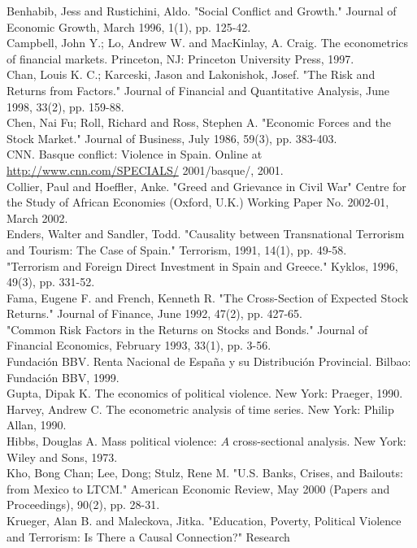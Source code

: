 \documentclass[10pt]{article}
\begin{document}
Benhabib, Jess and Rustichini, Aldo. "Social Conflict and Growth." Journal of Economic Growth, March 1996, 1(1), pp. 125-42.\\
Campbell, John Y.; Lo, Andrew W. and MacKinlay, A. Craig. The econometrics of financial markets. Princeton, NJ: Princeton University Press, 1997.\\
Chan, Louis K. C.; Karceski, Jason and Lakonishok, Josef. "The Risk and Returns from Factors." Journal of Financial and Quantitative Analysis, June 1998, 33(2), pp. 159-88.\\
Chen, Nai Fu; Roll, Richard and Ross, Stephen A. "Economic Forces and the Stock Market." Journal of Business, July 1986, 59(3), pp. 383-403.\\
CNN. Basque conflict: Violence in Spain. Online at \href{http://www.cnn.com/SPECIALS/}{http://www.cnn.com/SPECIALS/} 2001/basque/, 2001.\\
Collier, Paul and Hoeffler, Anke. "Greed and Grievance in Civil War" Centre for the Study of African Economies (Oxford, U.K.) Working Paper No. 2002-01, March 2002.\\
Enders, Walter and Sandler, Todd. "Causality between Transnational Terrorism and Tourism: The Case of Spain." Terrorism, 1991, 14(1), pp. 49-58.\\
"Terrorism and Foreign Direct Investment in Spain and Greece." Kyklos, 1996, 49(3), pp. 331-52.\\
Fama, Eugene F. and French, Kenneth R. "The Cross-Section of Expected Stock Returns." Journal of Finance, June 1992, 47(2), pp. 427-65.\\
"Common Risk Factors in the Returns on Stocks and Bonds." Journal of Financial Economics, February 1993, 33(1), pp. 3-56.\\
Fundación BBV. Renta Nacional de España y su Distribución Provincial. Bilbao: Fundación BBV, 1999.\\
Gupta, Dipak K. The economics of political violence. New York: Praeger, 1990.\\
Harvey, Andrew C. The econometric analysis of time series. New York: Philip Allan, 1990.\\
Hibbs, Douglas A. Mass political violence: $A$ cross-sectional analysis. New York: Wiley and Sons, 1973.\\
Kho, Bong Chan; Lee, Dong; Stulz, Rene M. "U.S. Banks, Crises, and Bailouts: from Mexico to LTCM." American Economic Review, May 2000 (Papers and Proceedings), 90(2), pp. 28-31.\\
Krueger, Alan B. and Maleckova, Jitka. "Education, Poverty, Political Violence and Terrorism: Is There a Causal Connection?" Research
\end{document}
